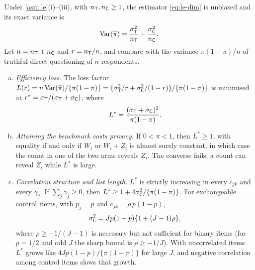 \begin{proposition}\label{prop:list-var}
Under \cref{asm:le}(i)--(iii), with $n_{\mathsf{T}},n_{\mathsf{C}}\ge1$, the estimator \eqref{eq:le-dim} is unbiased and its exact variance is
\begin{equation}\label{eq:le-var}
  \operatorname{Var}(\widehat\pi)=\frac{\sigma_{\mathsf{T}}^2}{n_{\mathsf{T}}}+\frac{\sigma_{\mathsf{C}}^2}{n_{\mathsf{C}}}.
\end{equation}
Let $n=n_{\mathsf{T}}+n_{\mathsf{C}}$ and $r=n_{\mathsf{T}}/n$, and compare with the variance $\pi(1-\pi)/n$ of truthful direct questioning of $n$ respondents.
\begin{enumerate}[(a)]
  \item \emph{Efficiency loss.} The loss factor $L(r)=n\operatorname{Var}(\widehat\pi)/\{\pi(1-\pi)\}=\{\sigma_{\mathsf{T}}^2/r+\sigma_{\mathsf{C}}^2/(1-r)\}/\{\pi(1-\pi)\}$ is minimised at $r^*=\sigma_{\mathsf{T}}/(\sigma_{\mathsf{T}}+\sigma_{\mathsf{C}})$, where
  \begin{equation}\label{eq:le-loss}
    L^*=\frac{(\sigma_{\mathsf{T}}+\sigma_{\mathsf{C}})^2}{\pi(1-\pi)}.
  \end{equation}
  \item \emph{Attaining the benchmark costs privacy.} If $0<\pi<1$, then $L^*\ge1$, with equality if and only if $W_i$ or $W_i+Z_i$ is almost surely constant, in which case the count in one of the two arms reveals $Z_i$. The converse fails: a count can reveal $Z_i$ while $L^*$ is large.
  \item \emph{Correlation structure and list length.} $L^*$ is strictly increasing in every $c_{jk}$ and every $\gamma_j$. If $\sum_j\gamma_j\ge0$, then $L^*\ge1+4\sigma_{\mathsf{C}}^2/\{\pi(1-\pi)\}$. For exchangeable control items, with $p_j=p$ and $c_{jk}=\rho\,p(1-p)$,
  \begin{equation}\label{eq:le-exch}
    \sigma_{\mathsf{C}}^2=Jp(1-p)\{1+(J-1)\rho\},
  \end{equation}
  where $\rho\ge-1/(J-1)$ is necessary but not sufficient for binary items (for $p=1/2$ and odd $J$ the sharp bound is $\rho\ge-1/J$). With uncorrelated items $L^*$ grows like $4Jp(1-p)/\{\pi(1-\pi)\}$ for large $J$, and negative correlation among control items slows that growth.
\end{enumerate}
\end{proposition}

